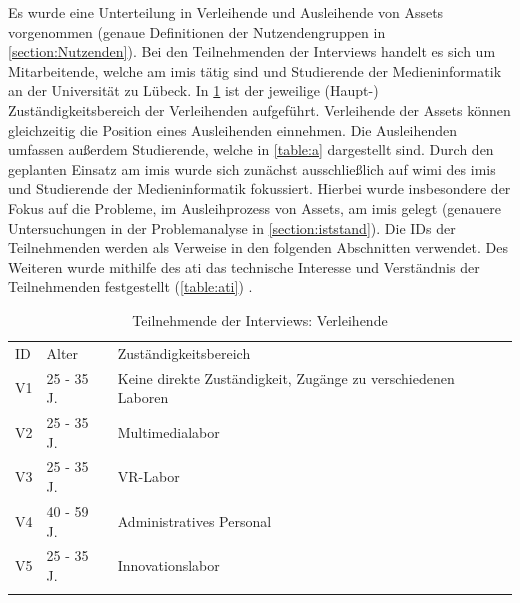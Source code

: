 Es wurde eine Unterteilung in Verleihende und Ausleihende von Assets vorgenommen
(genaue Definitionen der Nutzendengruppen in \ref{section:Nutzenden}). Bei den
Teilnehmenden der Interviews handelt es sich um Mitarbeitende, welche am
\ac{imis} tätig sind und Studierende der Medieninformatik an der Universität zu
Lübeck. In \ref{table:v} ist der jeweilige (Haupt-) Zuständigkeitsbereich der
Verleihenden aufgeführt. Verleihende der Assets können gleichzeitig die Position
eines Ausleihenden einnehmen. Die Ausleihenden umfassen außerdem Studierende,
welche in \ref{table:a} dargestellt sind. Durch den geplanten Einsatz am
\ac{imis} wurde sich zunächst ausschließlich auf \ac{wimi} des \ac{imis} und
Studierende der Medieninformatik fokussiert. Hierbei wurde insbesondere der
Fokus auf die Probleme, im Ausleihprozess von Assets, am \ac{imis} gelegt
(genauere Untersuchungen in der Problemanalyse in \ref{section:iststand}). Die
IDs der Teilnehmenden werden als Verweise in den folgenden Abschnitten
verwendet. Des Weiteren wurde mithilfe des \ac{ati} das technische Interesse und
Verständnis der Teilnehmenden festgestellt (\ref{table:ati})
\cite{attig_assessing_2017}.


\begin{table}[h]
        \centering
        \caption{Teilnehmende der Interviews: Verleihende}
        \begin{tabular}{lll}
                \arrayrulecolor{maincolor}\hline
                \sffamily\color{maincolor}ID & \sffamily\color{maincolor}Alter &
                \sffamily\color{maincolor}Zuständigkeitsbereich
                \\
                \arrayrulecolor{maincolor}\hline
                V1                           & 25 - 35 J.                      &
                Keine direkte Zuständigkeit, Zugänge zu verschiedenen Laboren
                \\
                V2                           & 25 - 35 J.                      &
                Multimedialabor                                                  \\
                V3                           & 25 - 35 J.                      &
                VR-Labor                                                         \\
                V4                           & 40 - 59 J.                      &
                Administratives Personal
                \\
                V5                           & 25 - 35 J.                      &
                Innovationslabor                                                 \\
                \arrayrulecolor{maincolor}\hline
        \end{tabular}
        \label{table:v}
\end{table}

